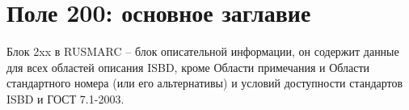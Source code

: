 \chapter{Поле 200: основное заглавие}

Блок 2xx в RUSMARC -- блок описательной информации, он содержит данные для всех областей описания ISBD, кроме Области примечания и Области стандартного номера (или его альтернативы) и условий доступности стандартов ISBD и ГОСТ 7.1-2003. 
